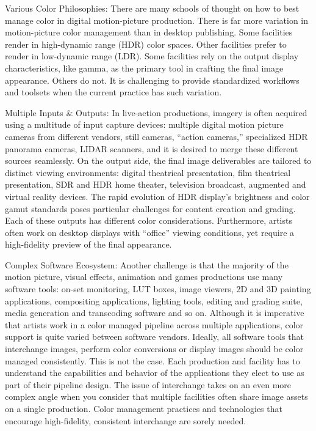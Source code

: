 Various Color Philosophies: There are many schools of thought on how to best manage color in digital motion-picture production. There is far more variation in motion-picture color management than in desktop publishing. Some facilities render in high-dynamic range (HDR) color spaces. Other facilities prefer to render in low-dynamic range (LDR). Some facilities rely on the output display characteristics, like gamma, as the primary tool in crafting the final image appearance. Others do not. It is challenging to provide standardized workflows and toolsets when the current practice has such variation.

Multiple Inputs & Outputs: In live-action productions, imagery is often acquired using a multitude of input capture devices: multiple digital motion picture cameras from different vendors, still cameras, “action cameras,” specialized HDR panorama cameras, LIDAR scanners, and it is desired to merge these different sources seamlessly. On the output side, the final image deliverables are tailored to distinct viewing environments: digital theatrical presentation, film theatrical presentation, SDR and HDR home theater, television broadcast, augmented and virtual reality devices. The rapid evolution of HDR display’s brightness and color gamut standards poses particular challenges for content creation and grading. Each of these outputs has different color considerations. Furthermore, artists often work on desktop displays with “office” viewing conditions, yet require a high-fidelity preview of the final appearance.

Complex Software Ecosystem: Another challenge is that the majority of the motion picture, visual effects, animation and games productions use many software tools: on-set monitoring, LUT boxes, image viewers, 2D and 3D painting applications, compositing applications, lighting tools, editing and grading suite, media generation and transcoding software  and so on. Although it is imperative that artists work in a color managed pipeline across multiple applications, color support is quite varied between software vendors. Ideally, all software tools that interchange images, perform color conversions or display images should be color managed consistently. This is not the case. Each production and facility has to understand the capabilities and behavior of the applications they elect to use as part of their pipeline design. The issue of interchange takes on an even more complex angle when you consider that multiple facilities often share image assets on a single production. Color management practices and technologies that encourage high-fidelity, consistent interchange are sorely needed.

